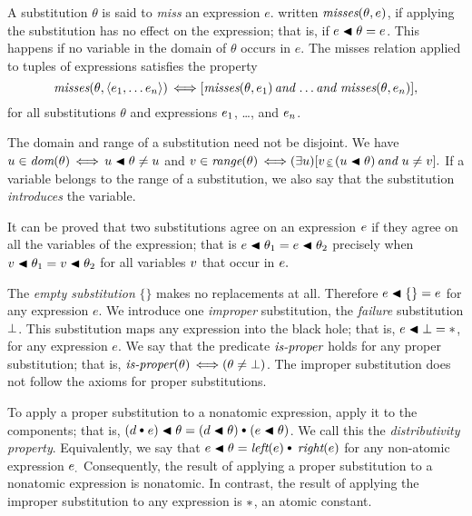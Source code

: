 \documentclass[runningheads]{llncs}
\DeclareMathOperator{\uand}{\emph{and}\,}
\DeclareMathOperator{\uiff}{\iff}
\DeclareMathOperator{\lef}{\emph{left}}
\DeclareMathOperator{\rig}{\emph{right}}
\begin{document}
A substitution $\theta$ is said to \emph{miss} an expression $e$. written $\emph{misses}(\theta, e)$, if applying the substitution has no effect on the expression; that is, if $e \blacktriangleleft \theta = e$. This happens if no variable in the domain of $\theta$ occurs in $e$. The misses relation applied to tuples of expressions satisfies the property
\[\misses(\theta, \langle \e{1}, \ldots \e{n} \rangle) \uiff
 [\misses(\theta, \e{1}) \uand \ldots \uand \misses(\theta, \e{n})],\] 
 for all substitutions $\theta$ and expressions $e_{1}$, \ldots, and $e_{n}$.


The domain and range of a substitution need not be disjoint. 
We have
 $u \in \dom(\theta) \uiff  u \apply \theta \neq u$  and $v \in \range(\theta) \uiff (\exists u)[v \occurseq (u \apply \theta) \uand u \neq v].$  If a variable belongs to the range of a substitution, we also say that the substitution \emph{introduces} the variable. 
 

 It can be proved that two substitutions agree on an expression $e$ if they agree on all the variables of the expression;  that is $e \blacktriangleleft \theta_{1} = e \blacktriangleleft \theta_{2}$ precisely when $ v \blacktriangleleft \theta_{1} = v \blacktriangleleft \theta_{2}$ for all variables $v$ that occur in $e.$






The \emph{empty substitution} $\{\}$ makes no replacements at all.  Therefore $e \blacktriangleleft \{\} = e$ for any expression $e$. We introduce one \emph{improper} substitution, the \emph{failure} substitution $\bot$.  This substitution maps any expression into the black hole; that is, $e \blacktriangleleft \bot = \ast$, for any expression $e$. We say that the predicate $\emph{is-proper}$ holds for any proper substitution; that is, $\isprop(\theta)\uiff(\theta \neq \bot)$. The improper substitution does not follow the axioms for proper substitutions.

To apply a proper substitution to a nonatomic expression, apply it to the components; that is, $ (d \cons e) \apply \theta = (d \apply \theta) \cons (e \apply \theta)$. We call this the \emph{distributivity property}. Equivalently, we say that $e \apply \theta = \lef(e) \cons \rig(e)$ for any non-atomic expression $e_{.}$  Consequently, the result of applying a proper substitution to a nonatomic expression is nonatomic.  In contrast, the result of applying the improper substitution to any expression is $\ast$, an atomic constant.
\end{document}
